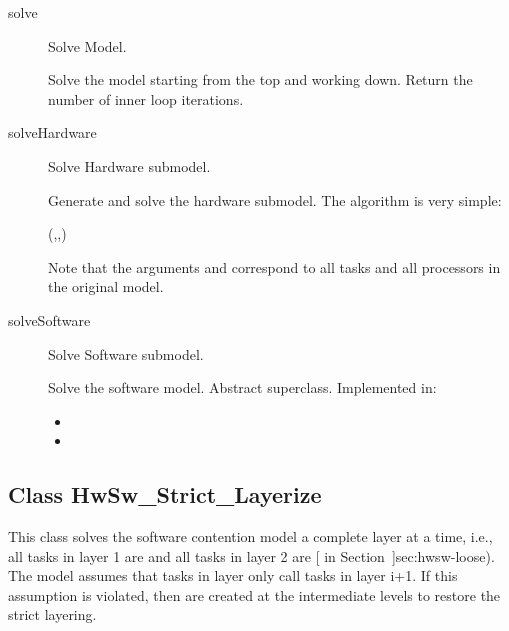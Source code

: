\begin{description}

\item[solve] \texonly{---} Solve Model.\\

Solve the model starting from the top and working down.  Return the
number of inner loop iterations.

\label{sec:hwsw-solveHardware}
\item[solveHardware] \texonly{---} Solve Hardware submodel.\\

Generate and solve the hardware submodel.  The algorithm is very simple:
\begin{example}
  (,,)
\end{example}

Note that the arguments  and  correspond to
all tasks and all processors in the original model.

\label{sec:hwsw-solveSoftware}
\item[solveSoftware] \texonly{---} Solve Software submodel.\\

Solve the software model.  Abstract superclass.  Implemented in:
\begin{itemize}
\item {}
\item {}
\end{itemize}
\end{description}


\htmlrule
\subsection{Class HwSw_Strict_Layerize}
\label{sec:hwsw-strict}

This class solves the software contention model a complete layer at a
time, i.e., all tasks in layer 1  are  and all tasks in
layer 2 are  [ in
Section~\Ref]{sec:hwsw-loose}).  The model assumes that tasks in layer
 only call tasks in layer {i+1}.  If this assumption is
violated, then  are created at the
intermediate levels to restore the strict layering.

